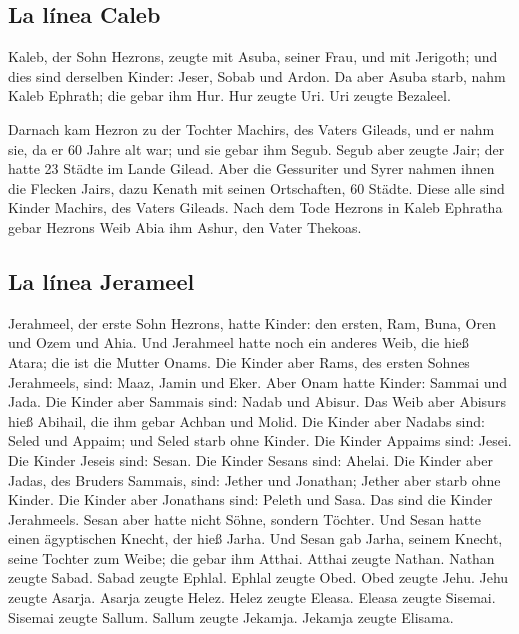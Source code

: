 \hypertarget{la-luxednea-caleb}{%
\subsection{La línea Caleb}\label{la-luxednea-caleb}}

 Kaleb, der Sohn Hezrons, zeugte mit Asuba, seiner Frau,
und mit Jerigoth; und dies sind derselben Kinder: Jeser, Sobab und
Ardon.  Da aber Asuba starb, nahm Kaleb Ephrath; die
gebar ihm Hur.  Hur zeugte Uri. Uri zeugte Bezaleel.

 Darnach kam Hezron zu der Tochter Machirs, des Vaters
Gileads, und er nahm sie, da er 60 Jahre alt war; und sie gebar ihm
Segub.  Segub aber zeugte Jair; der hatte 23 Städte im
Lande Gilead.  Aber die Gessuriter und Syrer nahmen ihnen
die Flecken Jairs, dazu Kenath mit seinen Ortschaften, 60 Städte. Diese
alle sind Kinder Machirs, des Vaters Gileads.  Nach dem
Tode Hezrons in Kaleb Ephratha gebar Hezrons Weib Abia ihm Ashur, den
Vater Thekoas.

\hypertarget{la-luxednea-jerameel}{%
\subsection{La línea Jerameel}\label{la-luxednea-jerameel}}

 Jerahmeel, der erste Sohn Hezrons, hatte Kinder: den
ersten, Ram, Buna, Oren und Ozem und Ahia.  Und Jerahmeel
hatte noch ein anderes Weib, die hieß Atara; die ist die Mutter Onams.
 Die Kinder aber Rams, des ersten Sohnes Jerahmeels,
sind: Maaz, Jamin und Eker.  Aber Onam hatte Kinder:
Sammai und Jada. Die Kinder aber Sammais sind: Nadab und Abisur.
 Das Weib aber Abisurs hieß Abihail, die ihm gebar Achban
und Molid.  Die Kinder aber Nadabs sind: Seled und
Appaim; und Seled starb ohne Kinder.  Die Kinder Appaims
sind: Jesei. Die Kinder Jeseis sind: Sesan. Die Kinder Sesans sind:
Ahelai.  Die Kinder aber Jadas, des Bruders Sammais,
sind: Jether und Jonathan; Jether aber starb ohne Kinder.
 Die Kinder aber Jonathans sind: Peleth und Sasa. Das
sind die Kinder Jerahmeels.  Sesan aber hatte nicht
Söhne, sondern Töchter. Und Sesan hatte einen ägyptischen Knecht, der
hieß Jarha.  Und Sesan gab Jarha, seinem Knecht, seine
Tochter zum Weibe; die gebar ihm Atthai.  Atthai zeugte
Nathan. Nathan zeugte Sabad.  Sabad zeugte Ephlal. Ephlal
zeugte Obed.  Obed zeugte Jehu. Jehu zeugte Asarja.
 Asarja zeugte Helez. Helez zeugte Eleasa.
 Eleasa zeugte Sisemai. Sisemai zeugte Sallum.
 Sallum zeugte Jekamja. Jekamja zeugte Elisama.

